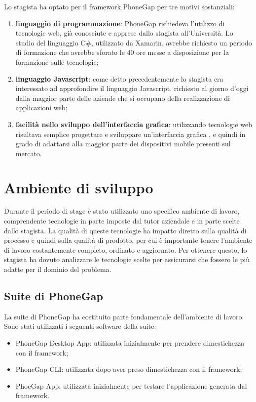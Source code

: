 Lo stagista ha optato per il framework PhoneGap per tre motivi sostanziali:
\begin{enumerate}
	\item \textbf{linguaggio di programmazione}: PhoneGap richiedeva l'utilizzo di tecnologie web, già conosciute e apprese dallo stagista all'Università. Lo studio del linguaggio C\#, utilizzato da Xamarin, avrebbe richiesto un periodo di formazione che avrebbe sforato le 40 ore messe a disposizione per la formazione sulle tecnologie;
	\item \textbf{linguaggio Javascript}: come detto precedentemente lo stagista era interessato ad approfondire il linguaggio Javascript, richiesto al giorno d'oggi dalla maggior parte delle aziende che si occupano della realizzazione di applicazioni web;
	\item \textbf{facilità nello sviluppo dell'interfaccia grafica}: utilizzando tecnologie web risultava semplice progettare e sviluppare un'interfaccia grafica , e quindi in grado di adattarsi alla maggior parte dei dispositivi mobile presenti sul mercato.
\end{enumerate}

\section{Ambiente di sviluppo}

Durante il periodo di stage è stato utilizzato uno specifico ambiente di lavoro, comprendente tecnologie in parte imposte dal tutor aziendale e in parte scelte dallo stagista. La qualità di queste tecnologie ha impatto diretto sulla qualità di processo e quindi sulla qualità di prodotto, per cui è importante tenere l'ambiente di lavoro costantemente completo, ordinato e aggiornato. Per ottenere questo, lo stagista ha dovuto analizzare le tecnologie scelte per assicurarsi che fossero le più adatte per il dominio del problema.

\subsection{Suite di PhoneGap}

La suite di PhoneGap ha costituito parte fondamentale dell'ambiente di lavoro. Sono stati utilizzati i seguenti software della suite:
\begin{itemize}
	\item PhoneGap Desktop App: utilizzata inizialmente per prendere dimestichezza con il framework;
	\item PhoneGap CLI: utilizzata dopo aver preso dimestichezza con il framework;
	\item PhoeGap App: utilizzata inizialmente per testare l'applicazione generata dal framework.
\end{itemize}

